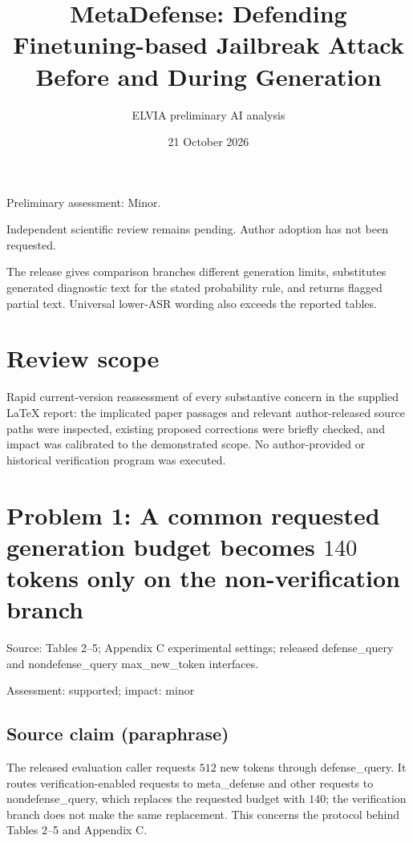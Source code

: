 \documentclass[11pt]{article}
\begin{document}
\title{MetaDefense: Defending Finetuning-based Jailbreak Attack Before and During Generation}

\author{ELVIA preliminary AI analysis}\date{21 October 2026}\maketitle

Preliminary assessment: Minor.\par

Independent scientific review remains pending. Author adoption has not been requested.

The release gives comparison branches different generation limits, substitutes generated diagnostic text for the stated probability rule, and returns flagged partial text. Universal lower-ASR wording also exceeds the reported tables.

\section*{Review scope}

Rapid current-version reassessment of every substantive concern in the supplied LaTeX report: the implicated paper passages and relevant author-released source paths were inspected, existing proposed corrections were briefly checked, and impact was calibrated to the demonstrated scope. No author-provided or historical verification program was executed.

\section*{Problem 1: A common requested generation budget becomes \(140\) tokens only on the non-verification branch}

Source: Tables 2–5; Appendix C experimental settings; released defense\_query and nondefense\_query max\_new\_token interfaces.

Assessment: supported; impact: minor

\subsection*{Source claim (paraphrase)}

The released evaluation caller requests \(512\) new tokens through defense\_query. It routes verification-enabled requests to meta\_defense and other requests to nondefense\_query, which replaces the requested budget with \(140\); the verification branch does not make the same replacement. This concerns the protocol behind Tables 2–5 and Appendix C.
\end{document}
